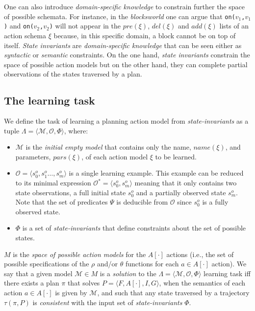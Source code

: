 \documentclass{article}
\newcommand{\tup}[1]{{\langle #1 \rangle}}
\begin{document}
One can also introduce {\em domain-specific knowledge} to constrain further the space of possible schemata. For instance, in the {\em blocksworld} one can argue that {\small\tt on($v_1$,$v_1$)} and {\small\tt on($v_2$,$v_2$)} will not appear in the $pre(\xi)$, $del(\xi)$ and $add(\xi)$ lists of an action schema $\xi$ because, in this specific domain, a block cannot be on top of itself. {\it State invariants} are {\em domain-specific knowledge} that can be seen either as {\em syntactic} or {\em semantic} constraints. On the one hand, {\it state invariants} constrain the space of possible action models but on the other hand, they can complete partial observations of the states traversed by a plan.

\subsection{The learning task}
We define the task of learning a planning action model from {\em state-invariants} as a tuple $\Lambda=\tup{\mathcal{M},{\mathcal O},\Phi}$, where:
\begin{itemize}
\item $\mathcal{M}$ is the {\em initial empty model} that contains only the name, $name(\xi)$, and parameters, $pars(\xi)$, of each action model $\xi$ to be learned.
\item $\mathcal{O}=\tup{s_0^o,s_1^o \ldots, s_m^o}$ is a single learning example. This example can be reduced to its minimal expression $\mathcal{O}^*=\tup{s_0^o, s_m^o}$ meaning that it only contains two state observations, a full initial state $s_0^o$ and a partially observed state $s_m^o$. Note that the set of predicates $\Psi$ is deducible from $\mathcal{O}$ since $s_0^o$ is a fully observed state.
\item $\Phi$ is a set of {\em state-invariants} that define constraints about the set of possible states.
\end{itemize}

$M$ is the {\em space of possible action models} for the $A[\cdot]$ actions (i.e., the set of possible specifications of the $\rho$ and/or $\theta$ functions for each $a\in A[\cdot]$ action). We say that a given model $\mathcal{M}\in M$ is a {\em solution} to the $\Lambda=\tup{\mathcal{M},{\mathcal O},\Phi}$ learning task iff there exists a plan $\pi$ that solves $P=\tup{F,A[\cdot],I,G}$, when the semantics of each action $a\in A[\cdot]$ is given by $\mathcal{M}$, and such that any state traversed by a trajectory $\tau(\pi,P)$ is {\em consistent} with the input set of {\em state-invariants} $\Phi$.
\end{document}
